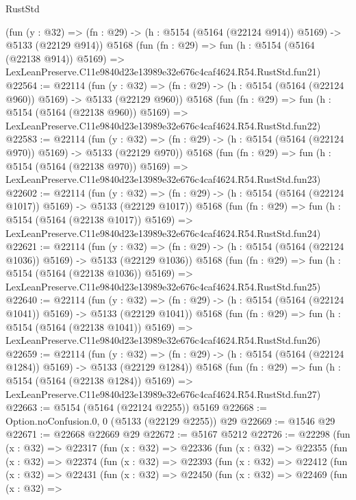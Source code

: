\begin{lexlean}{RustStd}
\begin{coremodule}
    (fun (y : @32) => (fn : @29) -> (h : @5154 (@5164 (@22124 @914)) @5169) -> @5133 (@22129 @914))
    @5168
    (fun (fn : @29) =>
    fun (h : @5154 (@5164 (@22138 @914)) @5169) =>
    LexLeanPreserve.C11e9840d23e13989e32e676c4caf4624.R54.RustStd.fun21)
@22564 := @22114
    (fun (y : @32) => (fn : @29) -> (h : @5154 (@5164 (@22124 @960)) @5169) -> @5133 (@22129 @960))
    @5168
    (fun (fn : @29) =>
    fun (h : @5154 (@5164 (@22138 @960)) @5169) =>
    LexLeanPreserve.C11e9840d23e13989e32e676c4caf4624.R54.RustStd.fun22)
@22583 := @22114
    (fun (y : @32) => (fn : @29) -> (h : @5154 (@5164 (@22124 @970)) @5169) -> @5133 (@22129 @970))
    @5168
    (fun (fn : @29) =>
    fun (h : @5154 (@5164 (@22138 @970)) @5169) =>
    LexLeanPreserve.C11e9840d23e13989e32e676c4caf4624.R54.RustStd.fun23)
@22602 := @22114
    (fun (y : @32) =>
    (fn : @29) -> (h : @5154 (@5164 (@22124 @1017)) @5169) -> @5133 (@22129 @1017))
    @5168
    (fun (fn : @29) =>
    fun (h : @5154 (@5164 (@22138 @1017)) @5169) =>
    LexLeanPreserve.C11e9840d23e13989e32e676c4caf4624.R54.RustStd.fun24)
@22621 := @22114
    (fun (y : @32) =>
    (fn : @29) -> (h : @5154 (@5164 (@22124 @1036)) @5169) -> @5133 (@22129 @1036))
    @5168
    (fun (fn : @29) =>
    fun (h : @5154 (@5164 (@22138 @1036)) @5169) =>
    LexLeanPreserve.C11e9840d23e13989e32e676c4caf4624.R54.RustStd.fun25)
@22640 := @22114
    (fun (y : @32) =>
    (fn : @29) -> (h : @5154 (@5164 (@22124 @1041)) @5169) -> @5133 (@22129 @1041))
    @5168
    (fun (fn : @29) =>
    fun (h : @5154 (@5164 (@22138 @1041)) @5169) =>
    LexLeanPreserve.C11e9840d23e13989e32e676c4caf4624.R54.RustStd.fun26)
@22659 := @22114
    (fun (y : @32) =>
    (fn : @29) -> (h : @5154 (@5164 (@22124 @1284)) @5169) -> @5133 (@22129 @1284))
    @5168
    (fun (fn : @29) =>
    fun (h : @5154 (@5164 (@22138 @1284)) @5169) =>
    LexLeanPreserve.C11e9840d23e13989e32e676c4caf4624.R54.RustStd.fun27)
@22663 := @5154 (@5164 (@22124 @2255)) @5169
@22668 := Option.noConfusion.{0, 0} (@5133 (@22129 @2255)) @29
@22669 := @1546 @29
@22671 := @22668 @22669 @29
@22672 := @5167 @5212
@22726 := @22298
    (fun (x : @32) =>
    @22317
      (fun (x : @32) =>
      @22336
        (fun (x : @32) =>
        @22355
          (fun (x : @32) =>
          @22374
            (fun (x : @32) =>
            @22393
              (fun (x : @32) =>
              @22412
                (fun (x : @32) =>
                @22431
                  (fun (x : @32) =>
                  @22450
                    (fun (x : @32) =>
                    @22469
                      (fun (x : @32) =>

\end{coremodule}
\end{lexlean}
